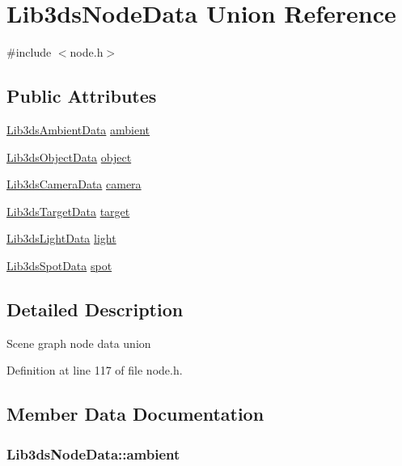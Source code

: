 \hypertarget{union_lib3ds_node_data}{\section{Lib3ds\-Node\-Data Union Reference}
\label{union_lib3ds_node_data}
}


{\ttfamily \#include $<$node.\-h$>$}

\subsection*{Public Attributes}
\begin{DoxyCompactItemize}
\item 
\hyperlink{struct_lib3ds_ambient_data}{Lib3ds\-Ambient\-Data} \hyperlink{union_lib3ds_node_data_a6ecea0dea19ad019ad6a6672e367c046}{ambient}
\item 
\hyperlink{struct_lib3ds_object_data}{Lib3ds\-Object\-Data} \hyperlink{union_lib3ds_node_data_ad4e35aca6a6a04b139895119d96676c6}{object}
\item 
\hyperlink{struct_lib3ds_camera_data}{Lib3ds\-Camera\-Data} \hyperlink{union_lib3ds_node_data_accabf5c52fbdd59f2f30d360dff09a94}{camera}
\item 
\hyperlink{struct_lib3ds_target_data}{Lib3ds\-Target\-Data} \hyperlink{union_lib3ds_node_data_a88266304b08754042e2754ac10fc94d2}{target}
\item 
\hyperlink{struct_lib3ds_light_data}{Lib3ds\-Light\-Data} \hyperlink{union_lib3ds_node_data_a65d2eb1d69e58a1aa93e9f42b6b395ec}{light}
\item 
\hyperlink{struct_lib3ds_spot_data}{Lib3ds\-Spot\-Data} \hyperlink{union_lib3ds_node_data_a888abb18834f617ef06440fdda035ed2}{spot}
\end{DoxyCompactItemize}


\subsection{Detailed Description}
Scene graph node data union 

Definition at line 117 of file node.\-h.



\subsection{Member Data Documentation}
\hypertarget{union_lib3ds_node_data_a6ecea0dea19ad019ad6a6672e367c046}{
\subsubsection[{ambient}]{ Lib3ds\-Node\-Data\-::ambient}}\label{union_lib3ds_node_data_a6ecea0dea19ad019ad6a6672e367c046}


